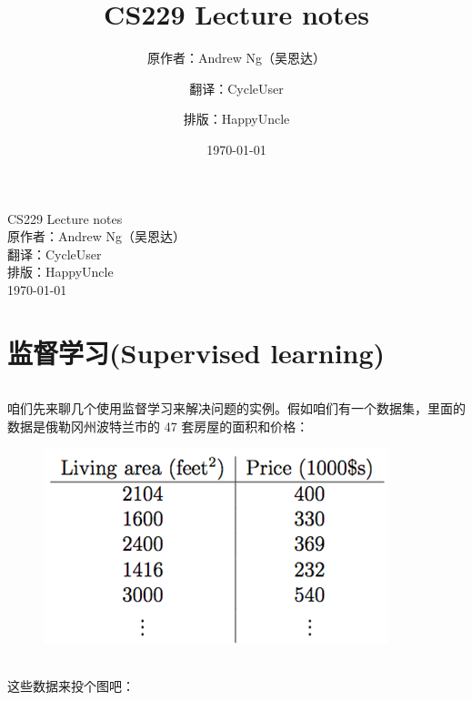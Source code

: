 \documentclass[UTF8]{ctexart}
\title{CS229 Lecture notes}
\author{原作者：Andrew Ng（吴恩达）}
\author{翻译：CycleUser}
\author{排版：HappyUncle}
\date{\today}
\begin{document}
	
	\paragraph{}
	\begin{description}
		\item[CS229 Lecture notes]
		\item[原作者：Andrew Ng（吴恩达）]
		\item[翻译：CycleUser]
		\item[排版：HappyUncle]
		\item[\today]
	\end{description}
	
	\part*{监督学习(Supervised learning)}
	
	\paragraph{}
		咱们先来聊几个使用监督学习来解决问题的实例。假如咱们有一个数据集，里面的数据是俄勒冈州波特兰市的 47 套房屋的面积和价格：
	
	\begin{figure}[h]
		\centering
		\includegraphics{images/screenshot001}
	\end{figure}
	
	\paragraph{}
		这些数据来投个图吧：
	
\end{document}
